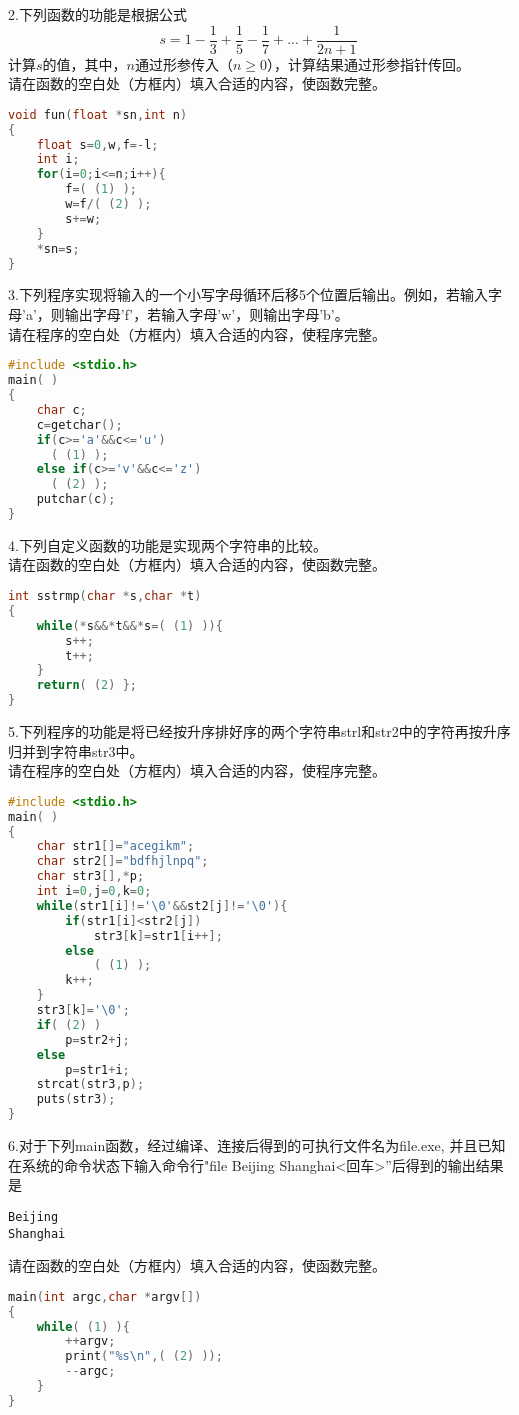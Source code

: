 2.下列函数的功能是根据公式
\begin{equation}
s=1-\frac{1}{3}+\frac{1}{5}-\frac{1}{7}+...+\frac{1}{2n+1}~
\end{equation}
计算$s$的值，其中，$n$通过形参传入（$n\geqslant0$），计算结果通过形参指针传回。 \\
请在函数的空白处（方框内）填入合适的内容，使函数完整。
\begin{lstlisting}[language=cpp]
void fun(float *sn,int n)
{
    float s=0,w,f=-l;
    int i;
    for(i=0;i<=n;i++){
        f=( (1) );
        w=f/( (2) );
        s+=w;
    }
    *sn=s;
}
\end{lstlisting}

3.下列程序实现将输入的一个小写字母循环后移5个位置后输出。例如，若输入字母'a'，则输出字母'f'，若输入字母'w'，则输出字母'b'。 \\
请在程序的空白处（方框内）填入合适的内容，使程序完整。
\begin{lstlisting}[language=cpp]
#include <stdio.h>
main( )
{
    char c;
    c=getchar();
    if(c>='a'&&c<='u')
      ( (1) );
    else if(c>='v'&&c<='z')
      ( (2) );
    putchar(c);
}
\end{lstlisting}

4.下列自定义函数的功能是实现两个字符串的比较。 \\
请在函数的空白处（方框内）填入合适的内容，使函数完整。
\begin{lstlisting}[language=cpp]
int sstrmp(char *s,char *t)
{
    while(*s&&*t&&*s=( (1) )){
        s++;
        t++;
    }
    return( (2) };
}
\end{lstlisting}

5.下列程序的功能是将已经按升序排好序的两个字符串strl和str2中的字符再按升序归并到字符串str3中。 \\
请在程序的空白处（方框内）填入合适的内容，使程序完整。
\begin{lstlisting}[language=cpp]
#include <stdio.h>
main( )
{
    char str1[]="acegikm";
    char str2[]="bdfhjlnpq";
    char str3[],*p;
    int i=0,j=0,k=0;
    while(str1[i]!='\0'&&st2[j]!='\0'){
        if(str1[i]<str2[j])
            str3[k]=str1[i++];
        else
            ( (1) );
        k++;
    }
    str3[k]='\0';
    if( (2) )
        p=str2+j;
    else
        p=str1+i;
    strcat(str3,p);
    puts(str3);
}
\end{lstlisting}

6.对于下列main函数，经过编译、连接后得到的可执行文件名为file.exe, 并且已知在系统的命令状态下输入命令行"file Beijing Shanghai<回车>”后得到的输出结果是
\begin{lstlisting}[language=none]
Beijing
Shanghai
\end{lstlisting}
请在函数的空白处（方框内）填入合适的内容，使函数完整。
\begin{lstlisting}[language=cpp]
main(int argc,char *argv[])
{
    while( (1) ){
        ++argv;
        print("%s\n",( (2) ));
        --argc;
    }
}
\end{lstlisting}

